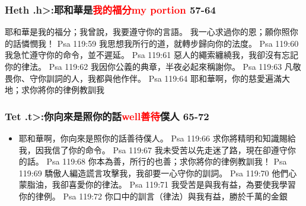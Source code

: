 \subsubsection{Heth  \<.h>:耶和華是\textcolor{red}{我的福分my portion} 57-64}
耶和華是我的福分；我曾說，我要遵守你的言語。 
我一心求過你的恩；願你照你的話憐憫我！ 
Psa 119:59  我思想我所行的道，就轉步歸向你的法度。 
Psa 119:60  我急忙遵守你的命令，並不遲延。 
Psa 119:61  惡人的繩索纏繞我，我卻沒有忘記你的律法。 
Psa 119:62  我因你公義的典章，半夜必起來稱謝你。 
Psa 119:63  凡敬畏你、守你訓詞的人，我都與他作伴。 
Psa 119:64  耶和華啊，你的慈愛遍滿大地；求你將你的律例教訓我


\subsubsection{Tet  \<.t>:你向來是照你的話\textcolor{red}{well善待}僕人 65-72}
\begin{itemize}
\itemsep-.45em
\item 耶和華啊，你向來是照你的話善待僕人。 
Psa 119:66  求你將精明和知識賜給我，因我信了你的命令。 
Psa 119:67  我未受苦以先走迷了路，現在卻遵守你的話。 
Psa 119:68  你本為善，所行的也善；求你將你的律例教訓我！ 
Psa 119:69  驕傲人編造謊言攻擊我，我卻要一心守你的訓詞。 
Psa 119:70  他們心蒙脂油，我卻喜愛你的律法。 
Psa 119:71  我受苦是與我有益，為要使我學習你的律例。 
Psa 119:72  你口中的訓言（律法）與我有益，勝於千萬的金銀
\end{itemize}

